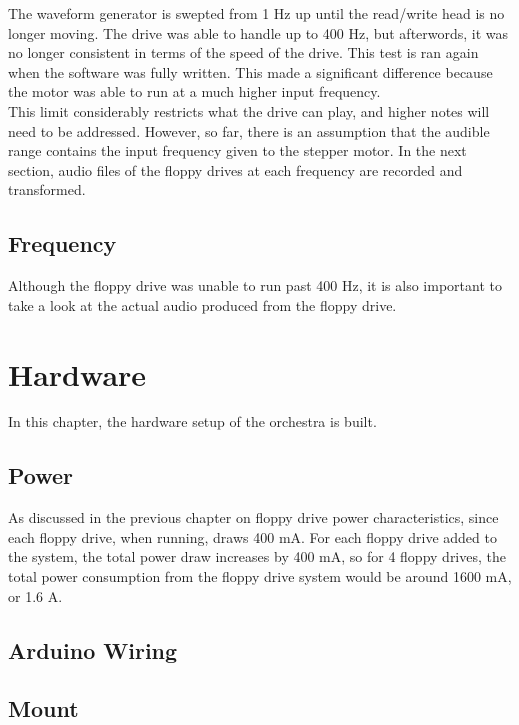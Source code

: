 \documentclass[11pt, a4paper]{report}
\begin{document}
The waveform generator is swepted from 1 Hz up until the read/write head is no longer moving. The drive was able to handle up to 400 Hz, but afterwords, it was no longer consistent in terms of the speed of the drive. This test is ran again when the software was fully written. This made a significant difference because the motor was able to run at a much higher input frequency. \\

This limit considerably restricts what the drive can play, and higher notes will need to be addressed. However, so far, there is an assumption that the audible range contains the input frequency given to the stepper motor. In the next section, audio files of the floppy drives at each frequency are recorded and transformed. \\

\section{Frequency}

Although the floppy drive was unable to run past 400 Hz, it is also important to take a look at the actual audio produced from the floppy drive. 


\chapter{Hardware}

In this chapter, the hardware setup of the orchestra is built.

\section{Power}


As discussed in the previous chapter on floppy drive power characteristics, since each floppy drive, when running, draws 400 mA. For each floppy drive added to the system, the total power draw increases by 400 mA, so for 4 floppy drives, the total power consumption from the floppy drive system would be around 1600 mA, or 1.6 A. 
  
\section{Arduino Wiring}

\section{Mount}
\end{document}
